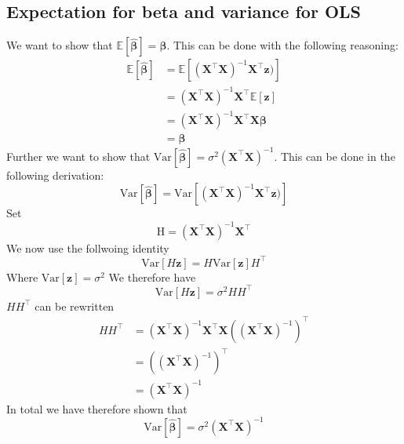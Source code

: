 \documentclass{article}
\newcommand{\EE}{\mathbb{E}}
\begin{document}
\subsection{Expectation for beta and variance for OLS}
\label{app_derivations:expectation_variance_betas}
We want to show that $\EE[\hat{\bm{\beta}}] = \bm{\beta}$. This can be done with the following reasoning:
\begin{align*}
    \EE[\hat{\bm{\beta}}] &= \EE[(\mathbf{X}^\top\mathbf{X})^{-1}\mathbf{X}^\top \bm{z})] \\
    &= (\mathbf{X}^\top\mathbf{X})^{-1}\mathbf{X}^\top \EE[\bm{z}] \\
    &= (\mathbf{X}^\top\mathbf{X})^{-1}\mathbf{X}^\top \mathbf{X} \bm{\beta} \\
    &= \bm{\beta}
\end{align*}
Further we want to show that $\text{Var}[\hat{\bm{\beta}}] = \sigma^2(\mathbf{X}^\top\mathbf{X})^{-1}$. This can be done in the following derivation: 
$$\text{Var}[\hat{\bm{\beta}}] = \text{Var}[(\mathbf{X}^\top\mathbf{X})^{-1}\mathbf{X}^\top \bm{z})]$$
Set 
$$\text{H} = (\mathbf{X}^\top\mathbf{X})^{-1}\mathbf{X}^\top$$
We now use the follwoing identity 
$$\text{Var}[H\bm{z}] = H \text{Var}[\bm{z}]H^\top$$
Where $\text{Var}[\bm{z}] = \sigma^2$
We therefore have
$$\text{Var}[H\bm{z}] = \sigma^2 HH^\top$$
$HH^\top$ can be rewritten
\begin{align*}
    HH^\top &= (\mathbf{X}^\top\mathbf{X})^{-1}\mathbf{X}^\top \mathbf{X}((\mathbf{X}^\top\mathbf{X})^{-1})^\top \\
    &= ((\mathbf{X}^\top\mathbf{X})^{-1})^\top \\
    &= (\mathbf{X}^\top\mathbf{X})^{-1}
\end{align*}
In total we have therefore shown that
$$\text{Var}[\hat{\bm{\beta}}] = \sigma^2(\mathbf{X}^\top\mathbf{X})^{-1}$$
\end{document}
